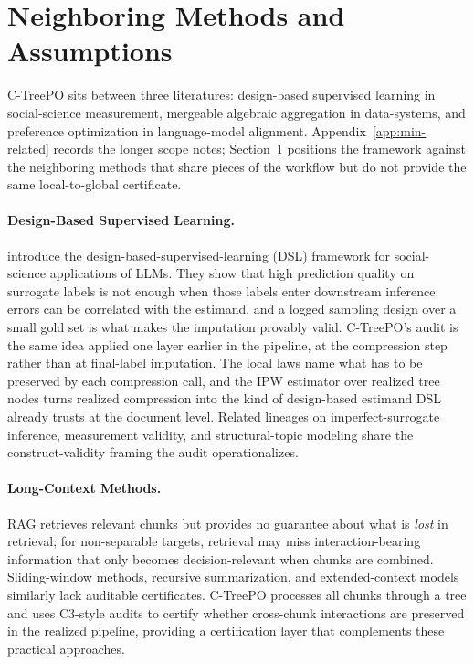 \section{Neighboring Methods and Assumptions}\label{sec:min-related}

C-TreePO sits between three literatures: design-based supervised learning
in social-science measurement, mergeable algebraic aggregation in
data-systems, and preference optimization in language-model alignment.
Appendix~\ref{app:min-related} records the longer scope notes;
Section~\ref{sec:min-related} positions the framework against the
neighboring methods that share pieces of the workflow but do not provide
the same local-to-global certificate.

\paragraph{Design-Based Supervised Learning.}
\citet{EgamiEtAl2024} introduce the design-based-supervised-learning (DSL)
framework for social-science applications of LLMs. They show that high
prediction quality on surrogate labels is not enough when those labels
enter downstream inference: errors can be correlated with the estimand,
and a logged sampling design over a small gold set is what makes the
imputation provably valid. C-TreePO's audit is the same idea applied one
layer earlier in the pipeline, at the compression step rather than at
final-label imputation. The local laws name what has to be preserved by
each compression call, and the IPW estimator over realized tree nodes
turns realized compression into the kind of design-based estimand DSL
already trusts at the document level. Related lineages on
imperfect-surrogate inference, measurement validity, and structural-topic
modeling \citep{RobertsStewartTingley2014} share the construct-validity
framing the audit operationalizes.

\paragraph{Long-Context Methods.}
RAG retrieves relevant chunks but provides no guarantee about what is
\emph{lost} in retrieval; for non-separable targets, retrieval may miss
interaction-bearing information that only becomes decision-relevant when
chunks are combined. Sliding-window methods, recursive summarization, and
extended-context models similarly lack auditable certificates. C-TreePO
processes all chunks through a tree and uses C3-style audits to certify
whether cross-chunk interactions are preserved in the realized pipeline,
providing a certification layer that complements these practical
approaches.

